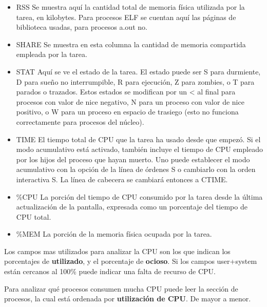 \documentclass[12pt]{article}
\begin{document}
\begin{itemize}
\item       RSS  Se muestra aquí la cantidad total de memoria física utilizada  por
            la  tarea,  en  kilobytes.  Para  procesos ELF se cuentan aquí las
            páginas de biblioteca usadas, para procesos a.out no.

\item       SHARE
            Se muestra en esta  columna  la  cantidad  de  memoria  compartida
            empleada por la tarea.

\item       STAT Aquí  se  ve  el  estado  de  la tarea. El estado puede ser S para
            durmiente, D para sueño no interrumpible, R para ejecución, Z para
            zombies,  o  T para parados o trazados. Estos estados se modifican
            por un < al final para procesos con valor de nice negativo, N para
            un  proceso  con  valor  de  nice positivo, o W para un proceso en
            espacio de trasiego (esto no funciona correctamente para  procesos
            del núcleo).

\item       TIME El tiempo total de CPU que la tarea ha usado desde que empezó.  Si
            el  modo  acumulativo  está activado, también incluye el tiempo de
            CPU empleado por los hijos del proceso que hayan muerto. Uno puede
            establecer  el  modo  acumulativo  con  la  opción  de la línea de
            órdenes S o cambiarlo con la orden interactiva  S.   La  línea  de
            cabecera se cambiará entonces a CTIME.

\item       \%CPU La  porción  del  tiempo  de  CPU  consumido por la tarea desde la
            última actualización de la pantalla, expresada como un  porcentaje
            del tiempo de CPU total.


\item       \%MEM La porción de la memoria física ocupada por la tarea.

\end{itemize}


Los campos mas utilizados para analizar la CPU son los que indican los porcentajes de \textbf{utilizado},
y el porcentaje de \textbf{ocioso}. Si los campos user+system están cercanos al 100\% puede indicar una falta de recurso de CPU.

Para analizar qué procesos consumen mucha CPU puede leer 
la sección de procesos, la cual está ordenada por \textbf{utilización de CPU}. De mayor a menor.
\end{document}
